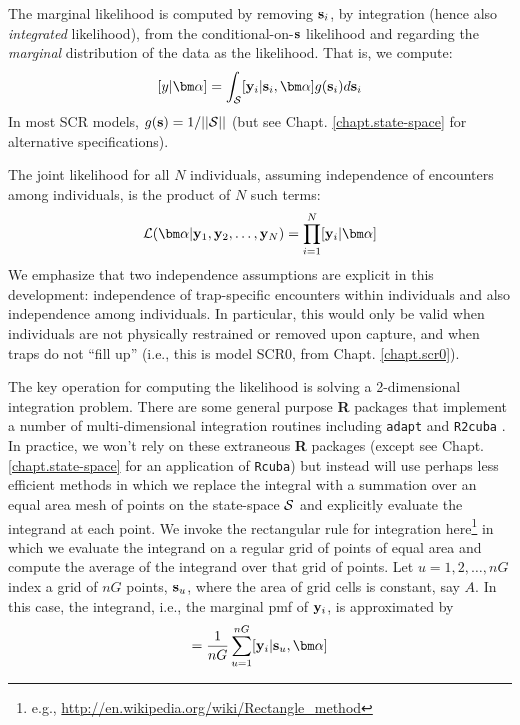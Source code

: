 The marginal likelihood is computed by removing
${\bf s}_{i}$, by integration (hence also {\it integrated} likelihood), from the conditional-on-${\bf s}$
likelihood and regarding the {\it marginal} distribution of the data
as 
the likelihood. That
is, we compute:
\[
  [y|{\bm \alpha}] = 
\int_{{\cal S}}  [ {\bf y}_{i} |{\bf s}_{i}, {\bm \alpha}] g({\bf s}_{i}) d{\bf s}_{i}
\]
In most SCR models, $g({\bf s}) = 1/||{\cal S}||$ (but see Chapt. \ref{chapt.state-space} for
alternative specifications).

The joint likelihood for all $N$ individuals, assuming independence of
encounters among individuals, is the product of $N$ such terms:
\[
{\cal L}({\bm \alpha} | {\bf y}_{1},{\bf y}_{2},\ldots, {\bf y}_{N}) =     \prod_{i=1}^{N}
[{\bf y}_{i}|{\bm \alpha}]
\]
We emphasize that two independence assumptions are explicit in this
development: independence of trap-specific encounters within
individuals and also independence among individuals. In particular,
this would only be valid when individuals are not physically
restrained or removed upon capture, and when traps do not ``fill up''
(i.e., this is model SCR0, from Chapt. \ref{chapt.scr0}).

The key operation for computing the likelihood is solving a
2-dimensional integration problem. There are some general purpose {\bf
  R} packages that implement a number of 
 multi-dimensional integration routines
including \mbox{\tt adapt} \citep{genz_etal:2007} and \mbox{\tt R2cuba}
\citep{hahn_etal:2011}.  In practice, we won't rely
on these extraneous {\bf R} packages (except see
Chapt. \ref{chapt.state-space} for an application of \mbox{\tt Rcuba})
but instead will use perhaps less
efficient methods in which we replace the integral with a summation
over an equal area mesh of points on the state-space ${\cal S}$ and explicitly
evaluate the integrand at each point. We invoke the rectangular rule
for integration here\footnote{e.g., 
\url{http://en.wikipedia.org/wiki/Rectangle_method}
} in which we
evaluate the
integrand on a regular grid of points of equal area and compute the
average of
the integrand over that grid of points. 
Let $u=1,2,\ldots,nG$ index a grid of
$nG$ points, ${\bf s}_{u}$,  where the area of grid cells is
constant, say $A$.
In this case, the integrand, i.e., the marginal pmf of 
${\bf y}_{i}$, is approximated by  
\begin{equation}
         [{\bf y}_{i}|{\bm \alpha}] = \frac{1}{nG} \sum_{u=1}^{nG}  [ {\bf
            y}_{i} |{\bf s}_u, {\bm \alpha}]
\label{mle.eq.intlik}
\end{equation}


